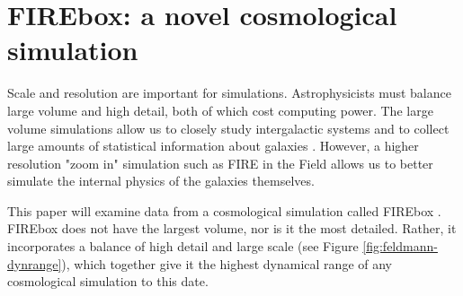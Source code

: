 \section{FIREbox: a novel cosmological simulation}
Scale and resolution are important for simulations. Astrophysicists must balance large volume and high detail, both of which cost computing power. The large volume simulations allow us to closely study intergalactic systems and to collect large amounts of statistical information about galaxies \citep{feldmannFIREboxSimulatingGalaxies2022}. However, a higher resolution "zoom in" simulation such as FIRE in the Field \citep{fittsFireFieldSimulating2017} allows us to better simulate the internal physics of the galaxies themselves.

This paper will examine data from a cosmological simulation called FIREbox \citep{feldmannFIREboxSimulatingGalaxies2022}. FIREbox does not have the largest volume, nor is it the most detailed. Rather, it incorporates a balance of high detail and large scale (see Figure \ref{fig:feldmann-dynrange}), which together give it the highest dynamical range of any cosmological simulation to this date. 

